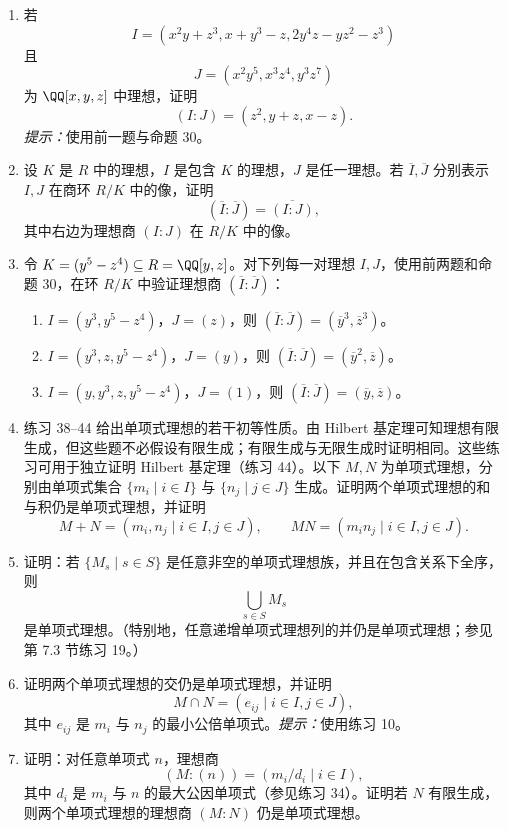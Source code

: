 \begin{enumerate}[label=\arabic*.]
	\item 若
	\[
	I=(x^2y+z^3,
	x+y^3-z,
	2y^4z-yz^2-z^3)
	\]
	且
	\[
	J=(x^2y^5,
	x^3z^4,
	y^3z^7)
	\]
	为 $\QQ[x,y,z]$ 中理想，证明
	\[
	(I:J)=(z^2,
	y+z,
	x-z).
	\]
	\emph{提示：}使用前一题与命题 30。
	
	\item 设 $K$ 是 $R$ 中的理想，$I$ 是包含 $K$ 的理想，$J$ 是任一理想。若 $\overline I,\overline J$ 分别表示 $I,J$ 在商环 $R/K$ 中的像，证明
	\[
	(\overline I:\overline J)=\overline{(I:J)},
	\]
	其中右边为理想商 $(I:J)$ 在 $R/K$ 中的像。
	
	\item 令 $K=(y^5-z^4)\subseteq R=\QQ[y,z]$。对下列每一对理想 $I,J$，使用前两题和命题 30，在环 $R/K$ 中验证理想商 $(\overline I:\overline J)$：
	\begin{enumerate}[label=(\roman*)]
		\item $I=(y^3,y^5-z^4)$，$J=(z)$，则 $(\overline I:\overline J)=(\overline{y}^3,
		\overline{z}^3)$。
		\item $I=(y^3,z,y^5-z^4)$，$J=(y)$，则 $(\overline I:\overline J)=(\overline{y}^2,
		\overline{z})$。
		\item $I=(y,y^3,z,y^5-z^4)$，$J=(1)$，则 $(\overline I:\overline J)=(\overline y,
		\overline z)$。
	\end{enumerate}
	
	\item 练习 38--44 给出单项式理想的若干初等性质。由 Hilbert 基定理可知理想有限生成，但这些题不必假设有限生成；有限生成与无限生成时证明相同。这些练习可用于独立证明 Hilbert 基定理（练习 44）。以下 $M,N$ 为单项式理想，分别由单项式集合 $\{m_i\mid i\in I\}$ 与 $\{n_j\mid j\in J\}$ 生成。证明两个单项式理想的和与积仍是单项式理想，并证明
	\[
	M+N=(m_i,n_j\mid i\in I,
	j\in J),
	\qquad MN=(m_i n_j\mid i\in I,
	j\in J).
	\]
	
	\item 证明：若 $\{M_s\mid s\in S\}$ 是任意非空的单项式理想族，并且在包含关系下全序，则
	\[
	\bigcup_{s\in S} M_s
	\]
	是单项式理想。（特别地，任意递增单项式理想列的并仍是单项式理想；参见第 7.3 节练习 19。）
	
	\item 证明两个单项式理想的交仍是单项式理想，并证明
	\[
	M\cap N=(e_{ij}\mid i\in I,
	j\in J),
	\]
	其中 $e_{ij}$ 是 $m_i$ 与 $n_j$ 的最小公倍单项式。\emph{提示：}使用练习 10。
	
	\item 证明：对任意单项式 $n$，理想商
	\[
	(M:(n))=(m_i/d_i\mid i\in I),
	\]
	其中 $d_i$ 是 $m_i$ 与 $n$ 的最大公因单项式（参见练习 34）。证明若 $N$ 有限生成，则两个单项式理想的理想商 $(M:N)$ 仍是单项式理想。
	

\end{enumerate}
